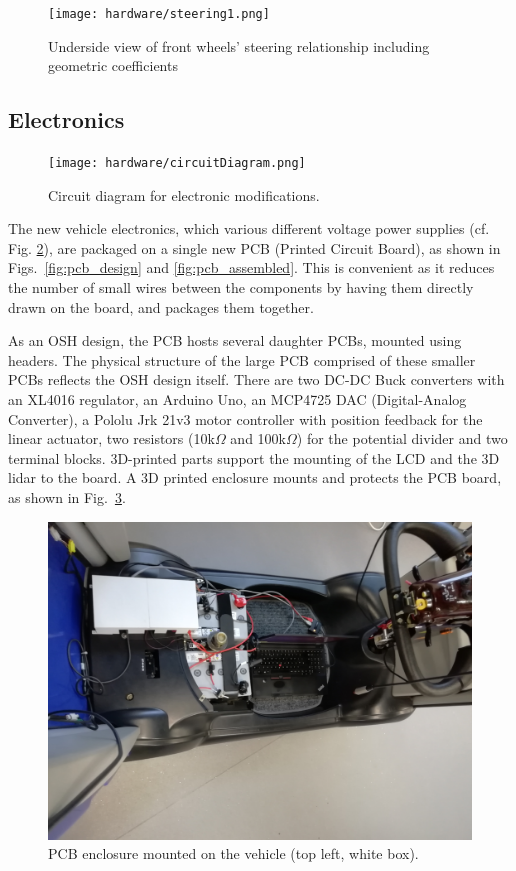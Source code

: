 \documentclass[a4paper]{article}
\begin{document}
	
	\begin{figure}[h]
		\texttt{[image: hardware/steering1.png]}
		\caption{Underside view of front wheels' steering relationship including geometric coefficients}
		\label{fig:steering}
	\end{figure}
	
	
	\subsection{Electronics}
	
	\begin{figure}[h]
		\texttt{[image: hardware/circuitDiagram.png]}
		\caption{Circuit diagram for electronic modifications.}
		\label{fig:circuitDiagram}
	\end{figure}
	
	
	The new vehicle electronics, which various different voltage power supplies (cf. Fig. \ref{fig:circuitDiagram}), are packaged on a single new PCB (Printed Circuit Board), as shown in Figs.~\ref{fig:pcb_design} and \ref{fig:pcb_assembled}. This is convenient as it reduces the number of small wires between the components by having them directly drawn on the board, and packages them together.
	
	As an OSH design, the PCB hosts several daughter PCBs, mounted using headers. The physical structure of the large PCB comprised of these smaller PCBs reflects the OSH design itself. There are two DC-DC Buck converters with an XL4016 regulator, an Arduino Uno, an MCP4725 DAC (Digital-Analog Converter), a Pololu Jrk 21v3 motor controller with position feedback for the linear actuator, two resistors (10k$\Omega$ and 100k$\Omega$) for the potential divider and two terminal blocks. 3D-printed parts support the mounting of the LCD and the 3D lidar to the board. A 3D printed enclosure mounts and protects the PCB board, as shown in Fig.~\ref{fig:pcb_enclosure}.
	
	\begin{figure}
		\centering
		\includegraphics[width=0.6\linewidth]{hardware/pcb_enclosure.jpg}
		\caption{PCB enclosure mounted on the vehicle (top left, white box).}
		\label{fig:pcb_enclosure}
	\end{figure}
	
\end{document}
